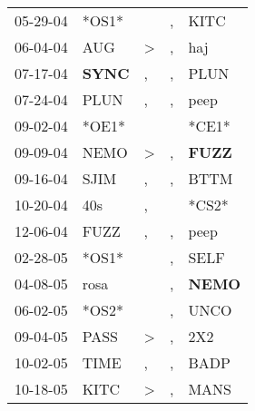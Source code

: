 \begin{supertabular}{p{0.07\textwidth}p{0.06\textwidth}p{0.02\textwidth}p{0.02\textwidth}p{0.06\textwidth}}
          05-29-04\textsuperscript{} &                            *OS1* &                  &             , &           KITC\textsuperscript{} \\
          06-04-04\textsuperscript{} &            AUG\textsuperscript{} &     \textgreater &             , &            haj\textsuperscript{} \\
          07-17-04\textsuperscript{} &  \textbf{SYNC\textsuperscript{}} &                , &             , &           PLUN\textsuperscript{} \\
          07-24-04\textsuperscript{} &           PLUN\textsuperscript{} &                , &             , &           peep\textsuperscript{} \\
          09-02-04\textsuperscript{} &                            *OE1* &                  &               &                            *CE1* \\
          09-09-04\textsuperscript{} &           NEMO\textsuperscript{} &     \textgreater &             , &  \textbf{FUZZ\textsuperscript{}} \\
          09-16-04\textsuperscript{} &           SJIM\textsuperscript{} &                , &             , &           BTTM\textsuperscript{} \\
          10-20-04\textsuperscript{} &            40s\textsuperscript{} &                , &               &                            *CS2* \\
          12-06-04\textsuperscript{} &           FUZZ\textsuperscript{} &                , &             , &           peep\textsuperscript{} \\
          02-28-05\textsuperscript{} &                            *OS1* &                  &             , &           SELF\textsuperscript{} \\
          04-08-05\textsuperscript{} &           rosa\textsuperscript{} &                  &             , &  \textbf{NEMO\textsuperscript{}} \\
          06-02-05\textsuperscript{} &                            *OS2* &                  &             , &           UNCO\textsuperscript{} \\
          09-04-05\textsuperscript{} &           PASS\textsuperscript{} &     \textgreater &             , &            2X2\textsuperscript{} \\
          10-02-05\textsuperscript{} &           TIME\textsuperscript{} &                , &             , &           BADP\textsuperscript{} \\
          10-18-05\textsuperscript{} &           KITC\textsuperscript{} &     \textgreater &             , &           MANS\textsuperscript{} \\

\end{supertabular}
